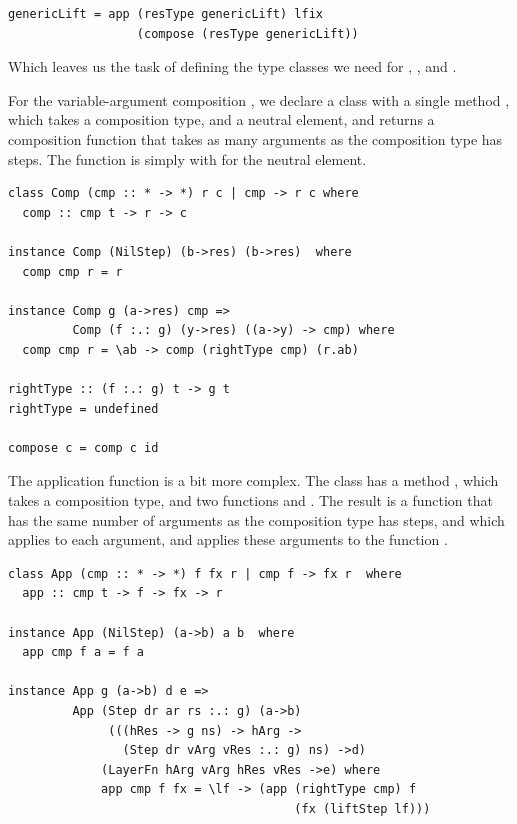 \documentclass[preprint,natbib]{sigplanconf}
\begin{document}
\begin{small}
\begin{verbatim}
genericLift = app (resType genericLift) lfix 
                  (compose (resType genericLift))
\end{verbatim}%
\end{small}

Which leaves us the task of defining the type classes we need for , , and .

For the variable-argument composition , we declare a class  with a single method , which takes a composition type, and a neutral element, and returns a composition function that takes as many arguments as the composition type has steps. The function  is simply  with  for the neutral element.

\begin{small}
\begin{verbatim}
class Comp (cmp :: * -> *) r c | cmp -> r c where
  comp :: cmp t -> r -> c

instance Comp (NilStep) (b->res) (b->res)  where
  comp cmp r = r  

instance Comp g (a->res) cmp =>
         Comp (f :.: g) (y->res) ((a->y) -> cmp) where
  comp cmp r = \ab -> comp (rightType cmp) (r.ab)

rightType :: (f :.: g) t -> g t
rightType = undefined

compose c = comp c id
\end{verbatim}
\end{small}

The application function is a bit more complex. The class  has a method , which takes a composition type, and two functions  and . The result is a function that has the same number of arguments as the composition type has steps, and which applies  to each argument, and applies these arguments to the function .

\begin{small}
\begin{verbatim}
class App (cmp :: * -> *) f fx r | cmp f -> fx r  where
  app :: cmp t -> f -> fx -> r

instance App (NilStep) (a->b) a b  where
  app cmp f a = f a

instance App g (a->b) d e =>
         App (Step dr ar rs :.: g) (a->b) 
              (((hRes -> g ns) -> hArg -> 
                (Step dr vArg vRes :.: g) ns) ->d) 
             (LayerFn hArg vArg hRes vRes ->e) where
             app cmp f fx = \lf -> (app (rightType cmp) f
                                        (fx (liftStep lf))) 
\end{verbatim}
\end{small}
\end{document}
